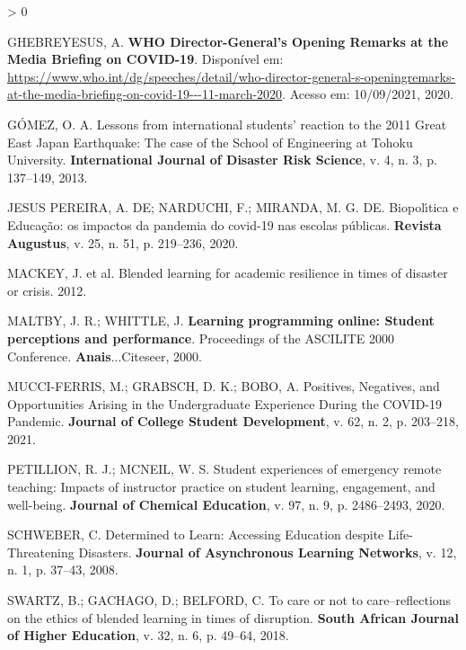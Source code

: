 \documentclass[
  12pt,
  portuguese,
]{article}
\newlength{\cslhangindent}
\newenvironment{CSLReferences}[2] %
 {%
  \setlength{\parindent}{0pt}
  \ifodd #1 \everypar{\setlength{\hangindent}{\cslhangindent}}\ignorespaces\fi
  \ifnum #2 > 0
  \setlength{\parskip}{#2\baselineskip}
  \fi
 }%
 {}
\begin{document}
\begin{CSLReferences}{0}{1}
\leavevmode\hypertarget{ref-who}{}%
GHEBREYESUS, A. \textbf{{WHO Director-General's Opening Remarks at the
Media Briefing on COVID-19}}. Disponível em:
\url{https://www.who.int/dg/speeches/detail/who-director-general-s-openingremarks-at-the-media-briefing-on-covid-19---11-march-2020}.
Acesso em: 10/09/2021, 2020.

\leavevmode\hypertarget{ref-gomez2013lessons}{}%
GÓMEZ, O. A. Lessons from international students' reaction to the 2011
Great East Japan Earthquake: The case of the School of Engineering at
Tohoku University. \textbf{International Journal of Disaster Risk
Science}, v. 4, n. 3, p. 137--149, 2013.

\leavevmode\hypertarget{ref-biopolitica}{}%
JESUS PEREIRA, A. DE; NARDUCHI, F.; MIRANDA, M. G. DE. Biopol{ı́}tica e
Educa{ç}{ã}o: os impactos da pandemia do covid-19 nas escolas
p{ú}blicas. \textbf{Revista Augustus}, v. 25, n. 51, p. 219--236, 2020.

\leavevmode\hypertarget{ref-mackey2012blended}{}%
MACKEY, J. et al. Blended learning for academic resilience in times of
disaster or crisis. 2012.

\leavevmode\hypertarget{ref-maltby2000learning}{}%
MALTBY, J. R.; WHITTLE, J. \textbf{Learning programming online: Student
perceptions and performance}. Proceedings of the ASCILITE 2000
Conference. \textbf{Anais}...Citeseer, 2000.

\leavevmode\hypertarget{ref-positives}{}%
MUCCI-FERRIS, M.; GRABSCH, D. K.; BOBO, A. Positives, Negatives, and
Opportunities Arising in the Undergraduate Experience During the
COVID-19 Pandemic. \textbf{Journal of College Student Development}, v.
62, n. 2, p. 203--218, 2021.

\leavevmode\hypertarget{ref-petillion2020student}{}%
PETILLION, R. J.; MCNEIL, W. S. Student experiences of emergency remote
teaching: Impacts of instructor practice on student learning,
engagement, and well-being. \textbf{Journal of Chemical Education}, v.
97, n. 9, p. 2486--2493, 2020.

\leavevmode\hypertarget{ref-schweber2008determined}{}%
SCHWEBER, C. Determined to Learn: Accessing Education despite
Life-Threatening Disasters. \textbf{Journal of Asynchronous Learning
Networks}, v. 12, n. 1, p. 37--43, 2008.

\leavevmode\hypertarget{ref-swartz2018care}{}%
SWARTZ, B.; GACHAGO, D.; BELFORD, C. To care or not to care--reflections
on the ethics of blended learning in times of disruption. \textbf{South
African Journal of Higher Education}, v. 32, n. 6, p. 49--64, 2018.


\end{CSLReferences}
\end{document}
